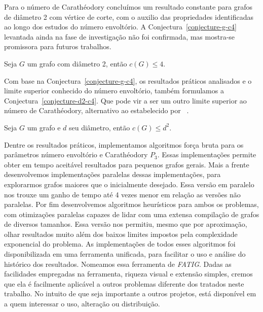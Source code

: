 Para o número de Carathéodory concluímos um resultado constante para grafos de diâmetro 2 com vértice de corte, com o auxilio das propriedades identificadas ao longo dos estudos do número envoltório. 
A Conjectura~\ref{conjecture-g-c4} levantada ainda na fase de investigação não foi confirmada, 
mas mostra-se promissora para futuros trabalhos. 

\begin{conjecture}
    Seja $G$ um grafo com diâmetro 2, então $c(G) \le 4$.
    \label{conjecture-g-c4}
\end{conjecture}

Com base na Conjectura~\ref{conjecture-g-c4}, 
os resultados práticos analisados 
e o limite superior conhecido do número envoltório, 
também formulamos a Conjectura~\ref{conjecture-d2-c4}.
Que pode vir a ser um outro limite superior ao número de Carathéodory, 
alternativo ao estabelecido por ~\cite{Barbosa2012}. 

\begin{conjecture}
    Seja $G$ um grafo e $d$ seu diâmetro, então $c(G) \le d^2$.
    \label{conjecture-d2-c4}
\end{conjecture}

Dentre os resultados práticos, 
implementamos algoritmos força bruta para os parâmetros número envoltório e Carathéodory $P_3$. Essas implementações permite obter em tempo aceitável resultados para pequenos grafos gerais.
Mais a frente desenvolvemos implementações paralelas dessas implementações, 
para explorarmos grafos maiores que o inicialmente desejado. Essa versão em paralelo nos trouxe um ganho de tempo até 4 vezes menor em relação as versões não paralelas.
Por fim desenvolvemos algoritmos heurísticos para ambos os problemas,
com otimizações paralelas capazes de lidar com uma extensa compilação de grafos de diversos tamanhos. Essa versão nos permitiu, mesmo que por aproximação,
olhar resultados muito além dos baixos limites impostos pela complexidade exponencial do problema.
As implementações de todos esses algoritmos foi disponibilizada em uma ferramenta unificada,
para facilitar o uso e análise do histórico dos resultados. Nomeamos essa ferramenta de {\it FATIG}.
Dadas as facilidades empregadas na ferramenta,
riqueza visual e extensão simples, cremos que ela é facilmente aplicável a outros problemas diferente dos tratados neste trabalho. No intuito de que seja importante a outros projetos, está disponível em \cite{braully2017} a quem interessar o uso, alteração ou distribuição.

